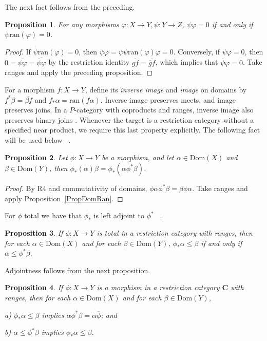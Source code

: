 \documentclass[letterpaper,10pt]{amsart}
\theoremstyle{plain}
\newtheorem{prop}{Proposition}[thm]
\theoremstyle{definition}
\newcommand{\MAP}[3]{{#1}:{#2}\rightarrow{#3}}
\newcommand{\rst}[1]{\overline{#1}}
\begin{document}
The next fact follows from the preceding.

\begin{prop}\label{PropExpected}
For any morphisms $\MAP{\varphi}{X}{Y},\MAP{\psi}{Y}{Z}$,
$\psi\varphi = 0$ if and only if
$\rst{\psi}\mathrm{ran}(\varphi)=0$.
\end{prop}
\begin{proof}
If $\rst{\psi}\mathrm{ran}(\varphi)=0$, then
$\psi\varphi=\psi\rst{\psi}\mathrm{ran}(\varphi)\varphi=0$.
Conversely, if $\psi\varphi=0$, then
$0=\rst{\psi\varphi}=\rst{\rst{\psi}\varphi}$ by the restriction identity $\rst{gf}=\rst{\rst g f}$, which implies that $\rst{\psi}\varphi=0$.
Take ranges and apply the preceding proposition.
\end{proof}

For a morphism $f:X\to Y$, define its \textit{inverse image} and
\textit{image} on domains by
$f^*\beta=\rst{\beta f}$ and $f_*\alpha=\mathrm{ran}(f\alpha)$.
Inverse image preserves meets, and image preserves joins. In a
$P$-category with coproducts and ranges, inverse image also preserves
binary joins \cite{MR88i:03078,MR92e:03067}. Whenever the target is
a restriction category without a specified near product, we require
this last property explicitly.
The following fact will be used below ~\cite[Cor. 5.6 (iii)]{MR88i:03078}.
\begin{prop}\label{PropImageFact}
Let $\MAP{\phi}{X}{Y}$ be a morphism, and let $\alpha\in\mathrm{Dom}(X)$ and  $\beta\in\mathrm{Dom}(Y)$, then
$\phi_*(\alpha)\beta =\phi_*(\alpha\phi^*\beta)$.
\end{prop}
\begin{proof}
By R4 and commutativity of domains,
$\phi\alpha\phi^*\beta=\beta\phi\alpha$.
Take ranges and apply Proposition~\ref{PropDomRan}.
\end{proof}

For ${\phi}$ total we have 
that $\phi_*$ is left adjoint to $\phi^*$ ~\cite{MR92e:03067}.

\begin{prop}
If $\MAP{\phi}{X}{Y}$ is total in a restriction category with ranges, then for each
$\alpha\in\mathrm{Dom}(X)$ and for each $\beta\in\mathrm{Dom}(Y)$,
$\phi_*\alpha\le\beta$ if and only if $\alpha\le\phi^*\beta$.
\end{prop}

Adjointness follows from the next proposition.

\begin{prop}\label{propsemiadjointness}
If $\MAP{\phi}{X}{Y}$ is a morphism in a restriction category $\mathbf{C}$ with ranges, then for each
$\alpha\in\mathrm{Dom}(X)$ and for each $\beta\in\mathrm{Dom}(Y)$,

a) $\phi_*\alpha\le\beta$ implies  $\alpha\phi^*\beta=\alpha\rst{\phi}$; and

b) $\alpha\le\phi^*\beta$ implies $\phi_*\alpha\le\beta$.
\end{prop}
\end{document}
